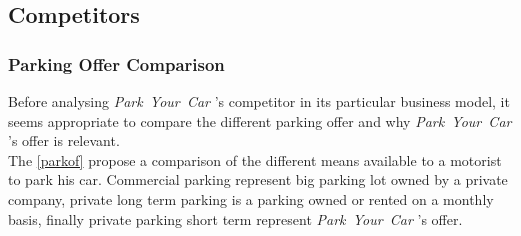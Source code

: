 \documentclass[12pt,a4paper,oneside]{book}
\newcommand{\bp}{\textit{Park~Your~Car }}
\begin{document}
\subsection{Competitors}
\subsubsection{Parking Offer Comparison}
Before analysing \bp 's competitor in its particular business model, it seems appropriate to compare the different parking offer and why \bp 's offer is relevant.\\

The \autoref{parkof} propose a comparison of the different means available to a motorist to park his car. Commercial parking represent big parking lot owned by a private company, private long term parking is a parking owned or rented on a monthly basis, finally private parking short term represent \bp 's offer.
\end{document}
